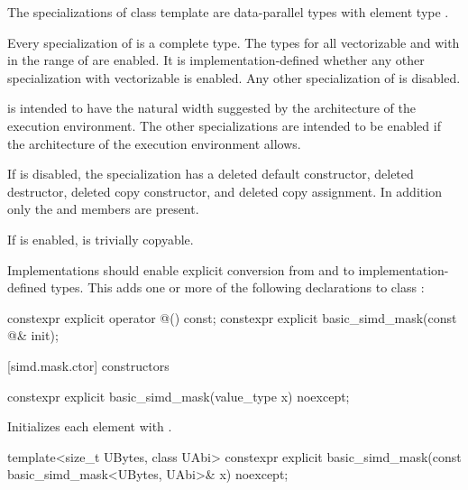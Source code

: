 \pnum
The specializations of class template  are data-parallel types with element
type .

\pnum
Every specialization of  is a complete type.
The types  for all vectorizable
 and with  in the range of  are enabled.
It is implementation-defined whether any other 
specialization with vectorizable  is enabled.
Any other specialization of  is disabled.

\begin{note}
   is intended to have the natural width suggested by the architecture
  of the execution environment.
  The other  specializations are intended to be enabled if the
  architecture of the execution environment allows.
\end{note}

If  is disabled, the specialization has a deleted
default constructor, deleted destructor, deleted copy constructor, and deleted copy assignment.
In addition only the  and  members are present.

If  is enabled,  is
trivially copyable.

\pnum
Implementations should enable explicit conversion from and to implementation-defined types. This
adds one or more of the following declarations to class :

\begin{codeblock}
constexpr explicit operator @\impdef@() const;
constexpr explicit basic_simd_mask(const @\impdef@& init);
\end{codeblock}

[simd.mask.ctor]{ constructors}

\begin{itemdecl}
constexpr explicit basic_simd_mask(value_type x) noexcept;
\end{itemdecl}

\begin{itemdescr}
  \pnum\effects
  Initializes each element with .
\end{itemdescr}

\begin{itemdecl}
template<size_t UBytes, class UAbi>
  constexpr explicit basic_simd_mask(const basic_simd_mask<UBytes, UAbi>& x) noexcept;
\end{itemdecl}

